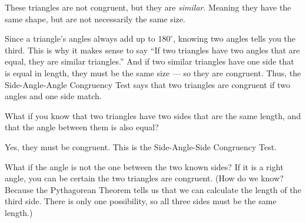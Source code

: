 These triangles are not congruent, but they are \emph{similar}. Meaning
 they have the same shape, but are not necessarily the same
size.

Since a triangle's angles always add up to $180^\circ$, knowing two angles tells you the third. This is why it makes sense
to say ``If two triangles have two angles that are equal, they are
similar triangles.''  And if two similar triangles have one side that
is equal in length, they must be the same size --- so they are
congruent. Thus, the Side-Angle-Angle Congruency Test says that
two triangles are congruent if two angles and one side match.

What if you know that two triangles have two sides that are the same
length, and that the angle between them is also equal?


Yes, they must be congruent. This is the Side-Angle-Side Congruency Test.

What if the angle is not the one between the two known sides? If it is
a right angle, you can be certain the two triangles are congruent.
(How do we know? Because the Pythagorean Theorem tells us that we can
calculate the length of the third side. There is only one possibility,
so all three sides must be the same length.)

